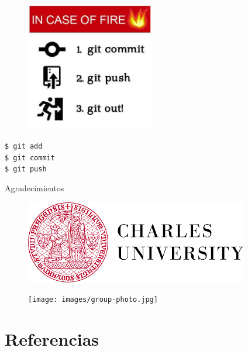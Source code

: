 \documentclass{beamer}
\begin{document}
  



\begin{frame}

\begin{figure}
  \includegraphics[width = 0.5\textwidth]{images/meme-git.jpg}
\end{figure}

\begin{block}{}
  {\texttt{\$ git add  }} \\
  {\texttt{\$ git commit  }} \\
  {\texttt{\$ git push }}
\end{block}

\end{frame}

\begin{frame}{Agradecimientos}
  
  \begin{figure}
    \includegraphics[width=\textwidth]{images/logo_charles.png}
  \end{figure}

  \begin{figure}
    \texttt{[image: images/group-photo.jpg]}
  \end{figure}


\end{frame}


\section{Referencias}
\end{document}
